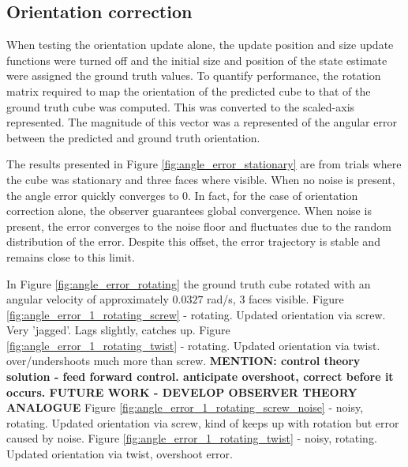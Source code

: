 \subsection{Orientation correction}
When testing the orientation update alone, the update position and size update functions were turned off and the initial size and position of the state estimate were assigned the ground truth values. To quantify performance, the rotation matrix required to map the orientation of the predicted cube to that of the ground truth cube was computed. This was converted to the scaled-axis represented. The magnitude of this vector was a represented of the angular error between the predicted and ground truth orientation.

The results presented in Figure \ref{fig:angle_error_stationary} are from trials where the cube was stationary and three faces where visible. When no noise is present, the angle error quickly converges to 0. In fact, for the case of orientation correction alone, the observer guarantees global convergence. When noise is present, the error converges to the noise floor and fluctuates due to the random distribution of the error. Despite this offset, the error trajectory is stable and remains close to this limit. 

In Figure \ref{fig:angle_error_rotating} the ground truth cube rotated with an angular velocity of approximately $0.0327$ rad/s, 3 faces visible.
Figure \ref{fig:angle_error_1_rotating_screw} - rotating. Updated orientation via screw. Very 'jagged'. Lags slightly, catches up.
Figure \ref{fig:angle_error_1_rotating_twist} - rotating. Updated orientation via twist. over/undershoots much more than screw. \textbf{MENTION: control theory solution - feed forward control. anticipate overshoot, correct before it occurs. FUTURE WORK - DEVELOP OBSERVER THEORY ANALOGUE}
Figure \ref{fig:angle_error_1_rotating_screw_noise} - noisy, rotating. Updated orientation via screw, kind of keeps up with rotation but error caused by noise.
Figure \ref{fig:angle_error_1_rotating_twist} - noisy, rotating. Updated orientation via twist, overshoot error. 

